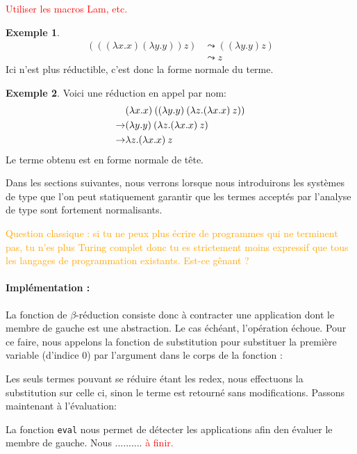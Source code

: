 \documentclass {article}
\newcommand{\codefrom}[3]
           {}
\theoremstyle{definition}
\newtheorem{example}{Exemple}
\theoremstyle{remark}
\newcommand{\todo}[1]{\textcolor{red}{#1}}
\newcommand{\attention}[1]{\textcolor{orange}{#1}}
\newcommand{\fun}[1]{\lstinline!#1!}
\begin{document}
\todo{Utiliser les macros Lam, etc.}
\begin{example}
  \begin{align*}
    (((\lambda x.x) (\lambda y.y)) z) &\leadsto ((\lambda y.y) z) \\
    & \leadsto z
  \end{align*}
  Ici  n'est plus réductible, c'est donc la forme normale du terme.
\end{example}


\begin{example}
  Voici une réduction en appel par nom:
  \begin{align*}
    & (\lambda x. x)\:({(\lambda y. y)\:({\lambda z. (\lambda x. x)\:z}})) \\
    \rightarrow & (\lambda y. y)\:({\lambda z. (\lambda x. x)\:z})\\
    \rightarrow & \lambda z. (\lambda x. x)\:z
  \end{align*}
  Le terme obtenu est en forme normale de tête.
\end{example}

Dans les sections suivantes, nous verrons lorsque nous introduirons
les systèmes de type que l'on peut statiquement garantir que les
termes acceptés par l'analyse de type sont fortement normalisants.

\attention{Question classique : si tu ne peux plus écrire de
  programmes qui ne terminent pas, tu n'es plus Turing complet donc tu
  es strictement moins expressif que tous les langages de
  programmation existants. Est-ce gênant ?}


\paragraph{Implémentation :}
La fonction de $\beta$-réduction consiste donc à contracter une
application dont le membre de gauche est une abstraction. Le cas
échéant, l'opération échoue. Pour ce faire, nous appelons la fonction
de substitution pour substituer la première variable (d'indice \(0\))
par l'argument dans le corps de la fonction :
%
\codefrom{untyped}{lambda}{reduction}

Les seuls termes pouvant se réduire étant les redex, nous effectuons la substitution sur celle ci,
sinon le terme est retourné sans modifications.
Passons maintenant à l'évaluation:

\codefrom{untyped}{lambda}{evaluation}

La fonction \fun{eval} nous permet de détecter les applications afin den évaluer le membre de gauche.
Nous .......... \todo{à finir.}
\end{document}
